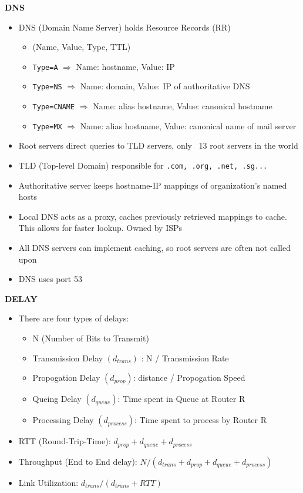 \documentclass[a4paper]{article} \usepackage[backend=biber, style=numeric, sorting=none]{biblatex}
\begin{document}
\begin{multicols*}{4}
\textbf{DNS}
\begin{itemize}[leftmargin=*]
\item DNS (Domain Name Server) holds Resource Records (RR)
  \begin{itemize}[leftmargin=*]
  \item (Name, Value, Type, TTL)
  \item \texttt{Type=A} $\Rightarrow$ Name: hostname, Value: IP
  \item \texttt{Type=NS} $\Rightarrow$ Name: domain, Value: IP of authoritative DNS
  \item \texttt{Type=CNAME} $\Rightarrow$ Name: alias hostname, Value: canonical hostname
  \item \texttt{Type=MX} $\Rightarrow$ Name: alias hostname, Value: canonical name of mail server
  \end{itemize}
\item Root servers direct queries to TLD servers, only ~13 root servers in the world
\item TLD (Top-level Domain) responsible for \texttt{.com, .org, .net, .sg...}
\item Authoritative server keeps hostname-IP mappings of organization's named hosts
\item Local DNS acts as a proxy, caches previously retrieved mappings to cache. This allows for faster lookup. Owned by ISPs
\item All DNS servers can implement caching, so root servers are often not called upon
\item DNS uses port 53
\end{itemize}

\textbf{DELAY}
\begin{itemize}[leftmargin=*]
\item There are four types of delays:
  \begin{itemize}[leftmargin=*]
  \item N (Number of Bits to Transmit)
  \item Transmission Delay $(d_{trans})$ : N / Transmission Rate
  \item Propogation Delay $(d_{prop})$: distance / Propogation Speed
  \item Queing Delay $(d_{queue})$: Time spent in Queue at Router R
  \item Processing Delay $(d_{process})$: Time spent to process by Router R
  \end{itemize}
\item RTT (Round-Trip-Time): $d_{prop} + d_{queue} + d_{process}$
\item Throughput (End to End delay): $N / (d_{trans} + d_{prop} + d_{queue} + d_{process})$
\item Link Utilization: $d_{trans} / (d_{trans} + RTT)$
\end{itemize}


\end{multicols*}
\end{document}
